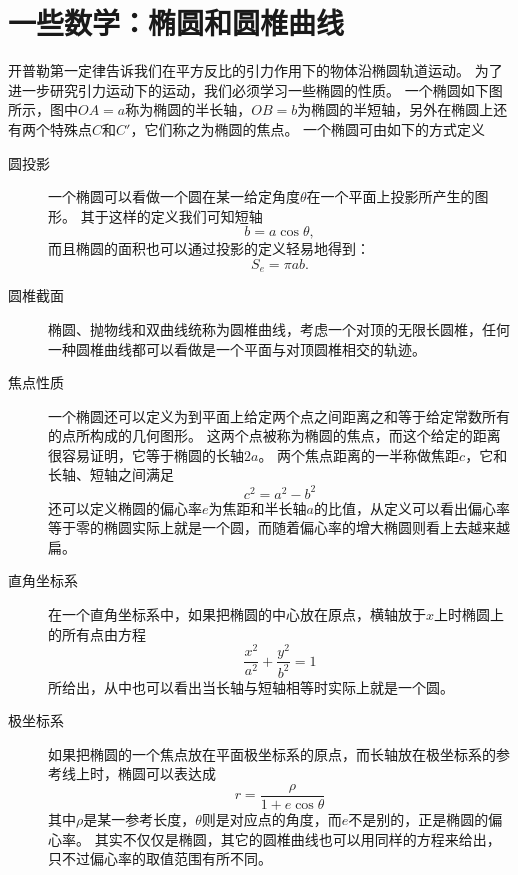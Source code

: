\section{一些数学：椭圆和圆椎曲线}
开普勒第一定律告诉我们在平方反比的引力作用下的物体沿椭圆轨道运动。
为了进一步研究引力运动下的运动，我们必须学习一些椭圆的性质。
一个椭圆如下图所示，图中$OA=a$称为椭圆的半长轴，$OB=b$为椭圆的半短轴，另外在椭圆上还有两个特殊点$C$和$C'$，它们称之为椭圆的焦点。
一个椭圆可由如下的方式定义
\begin{description}
\item[圆投影]
一个椭圆可以看做一个圆在某一给定角度$\theta$在一个平面上投影所产生的图形。
其于这样的定义我们可知短轴
\begin{equation}
b=a\cos\theta,
\end{equation}
而且椭圆的面积也可以通过投影的定义轻易地得到：
\begin{equation}
S_e=\pi ab.
\end{equation}
\item[圆椎截面]
椭圆、抛物线和双曲线统称为圆椎曲线，考虑一个对顶的无限长圆椎，任何一种圆椎曲线都可以看做是一个平面与对顶圆椎相交的轨迹。
\item[焦点性质]
一个椭圆还可以定义为到平面上给定两个点之间距离之和等于给定常数所有的点所构成的几何图形。
这两个点被称为椭圆的焦点，而这个给定的距离很容易证明，它等于椭圆的长轴$2a$。
两个焦点距离的一半称做焦距$c$，它和长轴、短轴之间满足
\begin{equation}
c^2=a^2-b^2
\end{equation}
还可以定义椭圆的偏心率$e$为焦距和半长轴$a$的比值，从定义可以看出偏心率等于零的椭圆实际上就是一个圆，而随着偏心率的增大椭圆则看上去越来越扁。
\item[直角坐标系]
在一个直角坐标系中，如果把椭圆的中心放在原点，横轴放于$x$上时椭圆上的所有点由方程
\begin{equation}
\frac{x^2}{a^2}+\frac{y^2}{b^2}=1
\end{equation}
所给出，从中也可以看出当长轴与短轴相等时实际上就是一个圆。
\item[极坐标系]
如果把椭圆的一个焦点放在平面极坐标系的原点，而长轴放在极坐标系的参考线上时，椭圆可以表达成
\begin{equation}
r = \frac{\rho}{1+e\cos\theta}
\end{equation}
其中$\rho$是某一参考长度，$\theta$则是对应点的角度，而$e$不是别的，正是椭圆的偏心率。
其实不仅仅是椭圆，其它的圆椎曲线也可以用同样的方程来给出，只不过偏心率的取值范围有所不同。
\end{description}

